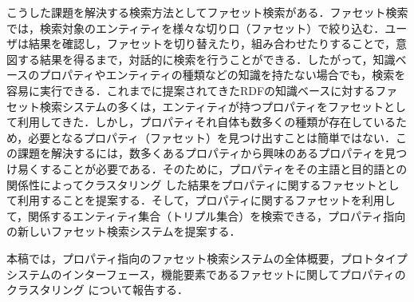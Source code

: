 こうした課題を解決する検索方法としてファセット検索がある．ファセット検索では，検索対象のエンティティを様々な切り口（ファセット）で絞り込む．ユーザは結果を確認し，ファセットを切り替えたり，組み合わせたりすることで，意図する結果を得るまで，対話的に検索を行うことができる．したがって，知識ベースのプロパティやエンティティの種類などの知識を持たない場合でも，検索を容易に実行できる．これまでに提案されてきたRDFの知識ベースに対するファセット検索システムの多くは，エンティティが持つプロパティをファセットとして利用してきた．しかし，プロパティそれ自体も数多くの種類が存在しているため，必要となるプロパティ（ファセット）を見つけ出すことは簡単ではない．この課題を解決するには，数多くあるプロパティから興味のあるプロパティを見つけ易くすることが必要である．そのために，プロパティをその主語と目的語との関係性によってクラスタリング した結果をプロパティに関するファセットとして利用することを提案する．そして，プロパティに関するファセットを利用して，関係するエンティティ集合（トリプル集合）を検索できる，プロパティ指向の新しいファセット検索システムを提案する．

本稿では，プロパティ指向のファセット検索システムの全体概要，プロトタイプシステムのインターフェース，機能要素であるファセットに関してプロパティのクラスタリング について報告する．